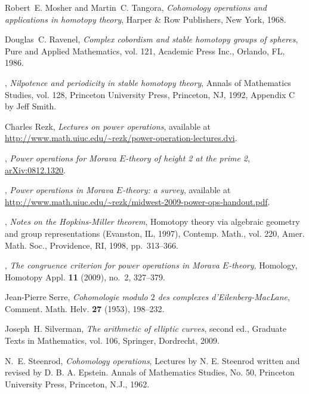 \documentclass{gtpart}
\theoremstyle{definition}
\theoremstyle{remark}
\begin{document}
\begin{thebibliography}
Robert~E. Mosher and Martin~C. Tangora, \emph{Cohomology operations and
  applications in homotopy theory}, Harper \& Row Publishers, New York, 1968.

Douglas~C. Ravenel, \emph{Complex cobordism and stable homotopy groups of
  spheres}, Pure and Applied Mathematics, vol. 121, Academic Press Inc.,
  Orlando, FL, 1986. 

\bysame, \emph{Nilpotence and periodicity in stable homotopy theory}, Annals of
  Mathematics Studies, vol. 128, Princeton University Press, Princeton, NJ,
  1992, Appendix C by Jeff Smith. 

Charles Rezk, \emph{Lectures on power operations}, available at
  \url{http://www.math.uiuc.edu/~rezk/power-operation-lectures.dvi}.

\bysame, \emph{Power operations for {M}orava ${E}$-theory of height 2 at the
  prime 2}, \href{http://arxiv.org/abs/0812.1320}{arXiv:0812.1320}.

\bysame, \emph{Power operations in {M}orava ${E}$-theory: a survey}, available
  at \url{http://www.math.uiuc.edu/~rezk/midwest-2009-power-ops-handout.pdf}.

\bysame, \emph{Notes on the {H}opkins-{M}iller theorem}, Homotopy theory via
  algebraic geometry and group representations ({E}vanston, {IL}, 1997),
  Contemp. Math., vol. 220, Amer. Math. Soc., Providence, RI, 1998,
  pp.~313--366. 

\bysame, \emph{The congruence criterion for power operations in {M}orava
  {$E$}-theory}, Homology, Homotopy Appl. \textbf{11} (2009), no.~2, 327--379.

Jean-Pierre Serre, \emph{Cohomologie modulo {$2$} des complexes
  d'{E}ilenberg-{M}ac{L}ane}, Comment. Math. Helv. \textbf{27} (1953),
  198--232. 

Joseph~H. Silverman, \emph{The arithmetic of elliptic curves}, second ed.,
  Graduate Texts in Mathematics, vol. 106, Springer, Dordrecht, 2009.

N.~E. Steenrod, \emph{Cohomology operations}, Lectures by N. E. Steenrod
  written and revised by D. B. A. Epstein. Annals of Mathematics Studies, No.
  50, Princeton University Press, Princeton, N.J., 1962. 


\end{thebibliography}
\end{document}
